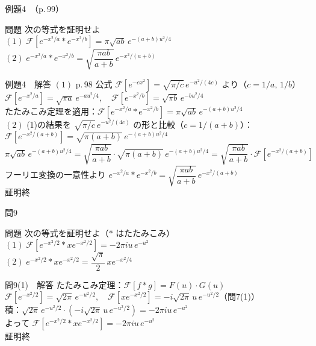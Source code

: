 \documentclass[professionalfonts]{beamer}
\begin{document}
\begin{frame}{例題4　（p.\,99）}
  \begin{exampleblock}{問題}
    次の等式を証明せよ\\[4pt]
    $(1)\; \mathcal{F}[e^{-x^{2}/a} * e^{-x^{2}/b}] = \pi\sqrt{ab}\,e^{-(a+b)u^{2}/4}$\\[6pt]
    $(2)\; e^{-x^{2}/a} * e^{-x^{2}/b} = \sqrt{\dfrac{\pi ab}{a+b}}\,e^{-x^{2}/(a+b)}$
  \end{exampleblock}
\end{frame}

\begin{frame}{例題4　解答}
  $(1)$ p.\,98 公式 $\mathcal{F}[e^{-cx^{2}}] = \sqrt{\pi/c}\,e^{-u^{2}/(4c)}$ より（$c=1/a,\,1/b$）\\[4pt]
  $\mathcal{F}[e^{-x^{2}/a}] = \sqrt{\pi a}\,e^{-au^{2}/4},\quad \mathcal{F}[e^{-x^{2}/b}] = \sqrt{\pi b}\,e^{-bu^{2}/4}$\\[4pt]
  たたみこみ定理を適用：$\mathcal{F}[e^{-x^{2}/a}*e^{-x^{2}/b}] = \pi\sqrt{ab}\,e^{-(a+b)u^{2}/4}$\\[6pt]
  $(2)$ (1)の結果を $\sqrt{\pi/c}\,e^{-u^{2}/(4c)}$ の形と比較（$c=1/(a+b)$）：\\[4pt]
  $\mathcal{F}[e^{-x^{2}/(a+b)}] = \sqrt{\pi(a+b)}\,e^{-(a+b)u^{2}/4}$\\[4pt]
  $\pi\sqrt{ab}\,e^{-(a+b)u^{2}/4} = \sqrt{\dfrac{\pi ab}{a+b}}\cdot\sqrt{\pi(a+b)}\,e^{-(a+b)u^{2}/4} = \sqrt{\dfrac{\pi ab}{a+b}}\cdot\mathcal{F}[e^{-x^{2}/(a+b)}]$\\[4pt]
  フーリエ変換の一意性より $e^{-x^{2}/a}*e^{-x^{2}/b} = \sqrt{\dfrac{\pi ab}{a+b}}\,e^{-x^{2}/(a+b)}$
  \\[4pt]\hfill 証明終
\end{frame}

\begin{frame}{問9　}
  \begin{exampleblock}{問題}
    次の等式を証明せよ（$*$ はたたみこみ）\\[6pt]
    $(1)\; \mathcal{F}[e^{-x^{2}/2} * xe^{-x^{2}/2}] = -2\pi iu\,e^{-u^{2}}$\\[4pt]
    $(2)\; e^{-x^{2}/2} * xe^{-x^{2}/2} = \dfrac{\sqrt{\pi}}{2}\,xe^{-x^{2}/4}$
  \end{exampleblock}
\end{frame}

\begin{frame}{問9(1)　解答}
  たたみこみ定理：$\mathcal{F}[f*g] = F(u)\cdot G(u)$\\[6pt]
  $\mathcal{F}[e^{-x^{2}/2}] = \sqrt{2\pi}\,e^{-u^{2}/2},\quad \mathcal{F}[xe^{-x^{2}/2}] = -i\sqrt{2\pi}\,u\,e^{-u^{2}/2}$（問7(1)）\\[6pt]
  積：$\sqrt{2\pi}\,e^{-u^{2}/2}\cdot(-i\sqrt{2\pi}\,u\,e^{-u^{2}/2}) = -2\pi iu\,e^{-u^{2}}$\\[4pt]
  よって $\mathcal{F}[e^{-x^{2}/2}*xe^{-x^{2}/2}] = -2\pi iu\,e^{-u^{2}}$
  \\[6pt]\hfill 証明終
\end{frame}
\end{document}
